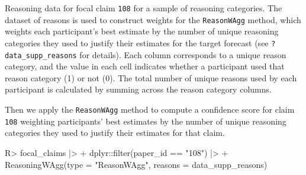 \documentclass[
  11pt,
  a4paper,
]{article}
\newenvironment{Shaded}{\begin{snugshade}}{\end{snugshade}}
\newcommand{\AttributeTok}[1]{\textcolor[rgb]{0.40,0.45,0.13}{#1}}
\newcommand{\FunctionTok}[1]{\textcolor[rgb]{0.28,0.35,0.67}{#1}}
\newcommand{\NormalTok}[1]{\textcolor[rgb]{0.00,0.23,0.31}{#1}}
\newcommand{\SpecialCharTok}[1]{\textcolor[rgb]{0.37,0.37,0.37}{#1}}
\newcommand{\StringTok}[1]{\textcolor[rgb]{0.13,0.47,0.30}{#1}}
\begin{document}
\begin{table}

\caption{\label{tbl-focal-claim-reasons}Reasoning data for focal claim
\texttt{108} for a sample of reasoning categories. The dataset of
reasons is used to construct weights for the \texttt{ReasonWAgg} method,
which weights each participant's best estimate by the number of unique
reasoning categories they used to justify their estimates for the target
forecast (see \texttt{?data\_supp\_reasons} for details). Each column
corresponds to a unique reason category, and the value in each cell
indicates whether a participant used that reason category (1) or not
(0). The total number of unique reasons used by each participant is
calculated by summing across the reason category columns.}


\end{table}%

Then we apply the \texttt{ReasonWAgg} method to compute a confidence
score for claim \texttt{108} weighting participants' best estimates by
the number of unique reasoning categories they used to justify their
estimates for that claim.

\begin{Shaded}
\begin{Highlighting}[]
\NormalTok{R}\SpecialCharTok{\textgreater{}}\NormalTok{ focal\_claims }\SpecialCharTok{|\textgreater{}}
\SpecialCharTok{+}\NormalTok{    dplyr}\SpecialCharTok{::}\FunctionTok{filter}\NormalTok{(paper\_id }\SpecialCharTok{==} \StringTok{"108"}\NormalTok{) }\SpecialCharTok{|\textgreater{}}
\SpecialCharTok{+}    \FunctionTok{ReasoningWAgg}\NormalTok{(}\AttributeTok{type =} \StringTok{"ReasonWAgg"}\NormalTok{, }\AttributeTok{reasons =}\NormalTok{ data\_supp\_reasons)}
\end{Highlighting}
\end{Shaded}
\end{document}
